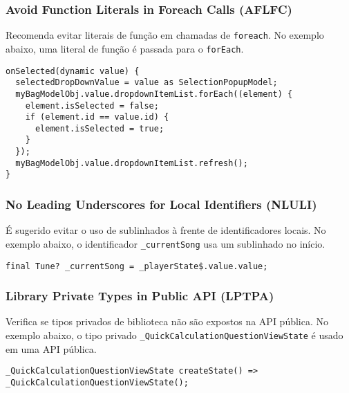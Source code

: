 \documentclass[12pt]{article}
\begin{document}
\subsubsection{Avoid Function Literals in Foreach Calls (AFLFC)}
Recomenda evitar literais de função em chamadas de \texttt{foreach}. No exemplo abaixo, uma literal de função é passada para o \texttt{forEach}.

\begin{tcolorbox}[codeSnippetStyle={Grocery-App/lib/presentation/my\_bag\_page/controller/my\_bag\_controller.dart}]
\begin{verbatim}
onSelected(dynamic value) { 
  selectedDropDownValue = value as SelectionPopupModel; 
  myBagModelObj.value.dropdownItemList.forEach((element) {
    element.isSelected = false; 
    if (element.id == value.id) {
      element.isSelected = true;
    }
  });
  myBagModelObj.value.dropdownItemList.refresh(); 
}
\end{verbatim}
\end{tcolorbox}

\subsubsection{No Leading Underscores for Local Identifiers (NLULI)}
É sugerido evitar o uso de sublinhados à frente de identificadores locais. No exemplo abaixo, o identificador \texttt{\_currentSong} usa um sublinhado no início.

\begin{tcolorbox}[codeSnippetStyle={flutter-tunein/lib/services/musicService.dart}]
\begin{verbatim}
final Tune? _currentSong = _playerState$.value.value;
\end{verbatim}
\end{tcolorbox}

\subsubsection{Library Private Types in Public API (LPTPA)}
Verifica se tipos privados de biblioteca não são expostos na API pública. No exemplo abaixo, o tipo privado \texttt{\_QuickCalculationQuestionViewState} é usado em uma API pública.

\begin{tcolorbox}[codeSnippetStyle={math-metrix/lib/src/ui/quickCalculation/quick\_calculation\_question\_view.dart}]
\begin{verbatim}
_QuickCalculationQuestionViewState createState() => _QuickCalculationQuestionViewState();
\end{verbatim}
\end{tcolorbox}
\end{document}
